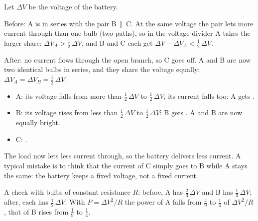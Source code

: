Let $\Delta V$ be the voltage of the battery.

Before: A is in series with the pair B\,$\|$\,C. At the same voltage the pair lets more current through than one bulb (two paths), so in the voltage divider A takes the larger share: $\Delta V_A > \frac{1}{2}\,\Delta V$, and B and C each get $\Delta V - \Delta V_A < \frac{1}{2}\,\Delta V$.

After: no current flows through the open branch, so C goes off. A and B are now two identical bulbs in series, and they share the voltage equally: $\Delta V_A = \Delta V_B = \frac{1}{2}\,\Delta V$.

\begin{itemize}
\item A: its voltage falls from more than $\frac{1}{2}\,\Delta V$ to $\frac{1}{2}\,\Delta V$, its current falls too: A gets .
\item B: its voltage rises from less than $\frac{1}{2}\,\Delta V$ to $\frac{1}{2}\,\Delta V$: B gets . A and B are now equally bright.
\item C: .
\end{itemize}

The load now lets less current through, so the battery delivers less current. A typical mistake is to think that the current of C simply goes to B while A stays the same: the battery keeps a fixed voltage, not a fixed current.

A check with bulbs of constant resistance $R$: before, A has $\frac{2}{3}\,\Delta V$ and B has $\frac{1}{3}\,\Delta V$; after, each has $\frac{1}{2}\,\Delta V$. With $P = \Delta V^2/R$ the power of A falls from $\frac{4}{9}$ to $\frac{1}{4}$ of $\Delta V^2/R$, that of B rises from $\frac{1}{9}$ to $\frac{1}{4}$.
